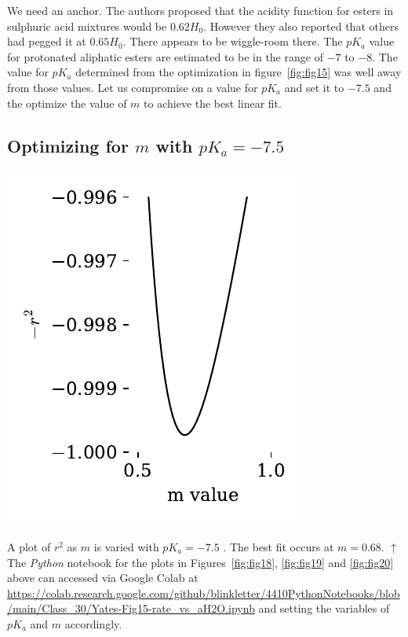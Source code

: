 \documentclass[]{tufte-handout}
\begin{document}
We need an anchor. The authors proposed that the acidity function for esters in sulphuric acid mixtures would be $0.62H_0$. However they also reported that others had pegged it at $0.65H_0$.  There appears to be wiggle-room there. The $pK_a$ value for protonated aliphatic esters are estimated to be in the range of $-7$ to $-8$. The value for $pK_a$ determined from the optimization in figure~\ref{fig:fig15} was well away from those values. Let us compromise on a value for $pK_a$ and set it to $-7.5$ and the optimize the value of $m$ to achieve the best linear fit.

\subsection{Optimizing for $m$ with $pK_a = -7.5$}

\begin{marginfigure}[20mm]
  \centering
  \includegraphics[scale=0.7]{images/fig20}
  \caption{A plot of $r^2$ as $m$ is varied with $pK_a = -7.5$ . The best fit occurs at $m = 0.68$. $\uparrow$  \\ \vspace{3mm} The \textit{Python} notebook for the plots in Figures~\ref{fig:fig18}, \ref{fig:fig19} and \ref{fig:fig20} above can accessed via Google Colab at \url{https://colab.research.google.com/github/blinkletter/4410PythonNotebooks/blob/main/Class_30/Yates-Fig15-rate_vs_aH2O.ipynb} and setting the variables of $pK_a$ and $m$ accordingly.} 
  \label{fig:fig20}
\end{marginfigure}
\end{document}
